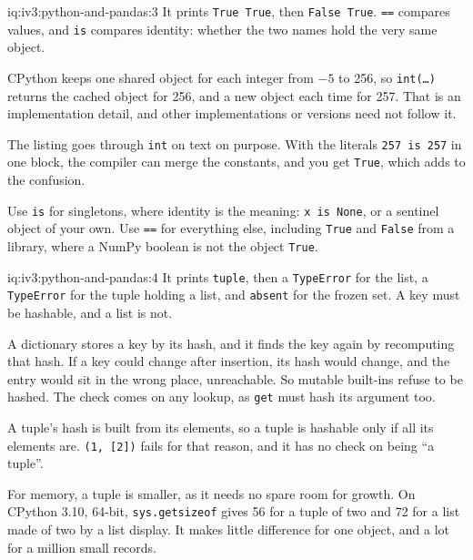 \begin{solution}{iq:iv3:python-and-pandas:3}
It prints \texttt{True True}, then \texttt{False True}. \texttt{==} compares values, and \texttt{is} compares identity: whether the two names hold the very same object.

CPython keeps one shared object for each integer from $-5$ to 256, so \texttt{int(\dots)} returns the cached object for 256, and a new object each time for 257. That is an implementation detail, and other implementations or versions need not follow it.

The listing goes through \texttt{int} on text on purpose. With the literals \texttt{257 is 257} in one block, the compiler can merge the constants, and you get \texttt{True}, which adds to the confusion.

Use \texttt{is} for singletons, where identity is the meaning: \texttt{x is None}, or a sentinel object of your own. Use \texttt{==} for everything else, including \texttt{True} and \texttt{False} from a library, where a NumPy boolean is not the object \texttt{True}.

\end{solution}

\begin{solution}{iq:iv3:python-and-pandas:4}
It prints \texttt{tuple}, then a \texttt{TypeError} for the list, a \texttt{TypeError} for the tuple holding a list, and \texttt{absent} for the frozen set. A key must be hashable, and a list is not.

A dictionary stores a key by its hash, and it finds the key again by recomputing that hash. If a key could change after insertion, its hash would change, and the entry would sit in the wrong place, unreachable. So mutable built-ins refuse to be hashed. The check comes on any lookup, as \texttt{get} must hash its argument too.

A tuple's hash is built from its elements, so a tuple is hashable only if all its elements are. \texttt{(1, [2])} fails for that reason, and it has no check on being ``a tuple''.

For memory, a tuple is smaller, as it needs no spare room for growth. On CPython 3.10, 64-bit, \texttt{sys.getsizeof} gives 56 for a tuple of two and 72 for a list made of two by a list display. It makes little difference for one object, and a lot for a million small records.

\end{solution}

